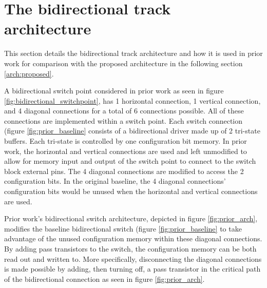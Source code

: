 
\section{The bidirectional track architecture}
\label{arch:limitations}
This section details the bidirectional track architecture and how it is used in prior work for comparison with the proposed architecture in the following section \ref{arch:proposed}. 

A bidirectional switch point considered in prior work as seen in figure \ref{fig:bidirectional_switchpoint}, has 1 horizontal connection, 1 vertical connection, and 4 diagonal connections for a total of 6 connections possible. All of these connections are implemented within a switch point. Each switch connection (figure \ref{fig:prior_baseline} consists of a bidirectional driver made up of 2 tri-state buffers. Each tri-state is controlled by one configuration bit memory. In prior work, the horizontal and vertical connections are used and left unmodified to allow for memory input and output of the switch point to connect to the switch block external pins. The 4 diagonal connections are modified to access the 2 configuration bits. In the original baseline, the 4 diagonal connections' configuration bits would be unused when the horizontal and vertical connections are used.

Prior work's bidirectional switch architecture, depicted in figure \ref{fig:prior_arch}, modifies the baseline bidirectional switch (figure \ref{fig:prior_baseline} to take advantage of the unused configuration memory within these diagonal connections. By adding pass transistors to the switch, the configuration memory can be both read out and written to. More specifically, disconnecting the diagonal connections is made possible by adding, then turning off, a pass transistor in the critical path of the bidirectional connection as seen in figure \ref{fig:prior_arch}.

